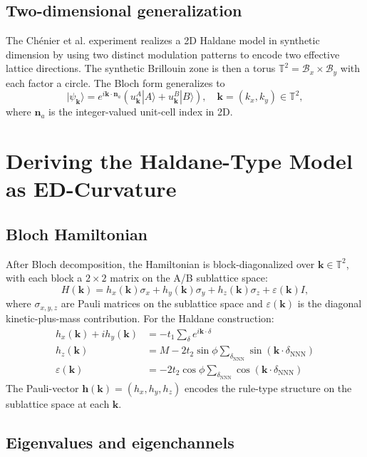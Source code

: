 \documentclass[11pt,a4paper]{article}
\begin{document}
\subsection{Two-dimensional generalization}

The Ch\'enier et al. experiment realizes a 2D Haldane model in synthetic dimension by using two distinct modulation patterns to encode two effective lattice directions. The synthetic Brillouin zone is then a torus $\mathbb{T}^2 = \mathcal{B}_x \times \mathcal{B}_y$ with each factor a circle. The Bloch form generalizes to
\[
|\psi_\mathbf{k}\rangle = e^{i\mathbf{k}\cdot\mathbf{n}_a}(u^A_\mathbf{k}|A\rangle + u^B_\mathbf{k}|B\rangle), \quad \mathbf{k} = (k_x, k_y) \in \mathbb{T}^2,
\]
where $\mathbf{n}_a$ is the integer-valued unit-cell index in 2D.

\section{Deriving the Haldane-Type Model as ED-Curvature}

\subsection{Bloch Hamiltonian}

After Bloch decomposition, the Hamiltonian is block-diagonalized over $\mathbf{k} \in \mathbb{T}^2$, with each block a $2\times 2$ matrix on the A/B sublattice space:
\[
H(\mathbf{k}) = h_x(\mathbf{k})\sigma_x + h_y(\mathbf{k})\sigma_y + h_z(\mathbf{k})\sigma_z + \varepsilon(\mathbf{k}) I,
\]
where $\sigma_{x,y,z}$ are Pauli matrices on the sublattice space and $\varepsilon(\mathbf{k})$ is the diagonal kinetic-plus-mass contribution. For the Haldane construction:
\begin{align*}
h_x(\mathbf{k}) + i h_y(\mathbf{k}) &= -t_1\sum_{\delta}e^{i\mathbf{k}\cdot\delta} \\
h_z(\mathbf{k}) &= M - 2t_2\sin\phi\sum_{\delta_{\mathrm{NNN}}}\sin(\mathbf{k}\cdot\delta_{\mathrm{NNN}}) \\
\varepsilon(\mathbf{k}) &= -2t_2\cos\phi\sum_{\delta_{\mathrm{NNN}}}\cos(\mathbf{k}\cdot\delta_{\mathrm{NNN}})
\end{align*}
The Pauli-vector $\mathbf{h}(\mathbf{k}) = (h_x, h_y, h_z)$ encodes the rule-type structure on the sublattice space at each $\mathbf{k}$.

\subsection{Eigenvalues and eigenchannels}
\end{document}
